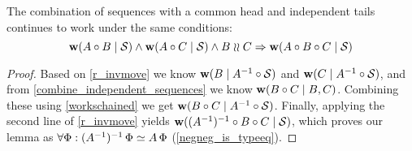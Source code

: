 \begin{mylem}\label{indep_prefix_combine}
The combination of sequences with a common head and independent tails 
continues to work under the same conditions:
\[ \mathbf{w}({A\circ B}\mathrel{|}{\mathcal{S}}) \wedge \mathbf{w}({A\circ C}\mathrel{|}{\mathcal{S}}) \wedge B\mathrel{\wr\wr} C \Rightarrow \mathbf{w}({A\circ B\circ C}\mathrel{|}{\mathcal{S}}) \]
\end{mylem}
\begin{proof}
Based on \cref{r_invmove} we know
$\mathbf{w}({B}\mathrel{|}{A^{-1}\circ \mathcal{S}})$ and $\mathbf{w}({C}\mathrel{|}{A^{-1}\circ \mathcal{S}})$,
and from \cref{combine_independent_sequences} we know
$\mathbf{w}({B\circ C}\mathrel{|}{B,C})$.
Combining these using \cref{workschained}
we get
$\mathbf{w}({B\circ C}\mathrel{|}{A^{-1}\circ \mathcal{S}})$. 
Finally, applying the second line of \cref{r_invmove} yields
$\mathbf{w}({(A^{-1})^{-1}\circ B\circ C}\mathrel{|}{\mathcal{S}})$, which proves our lemma 
as $\forall\Phi: (A^{-1})^{-1}\,\Phi\simeq A\,\Phi$ (\cref{negneg_is_typeeq}).
\end{proof}
